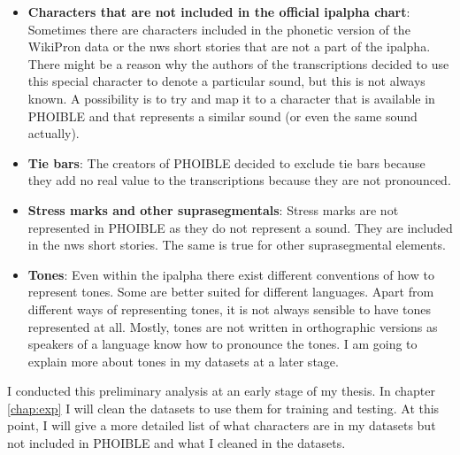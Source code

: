 \begin{itemize}
\item \textbf{Characters that are not included in the official \ac{ipalpha} chart}: Sometimes there are characters included in the phonetic version of the WikiPron data or the \ac{nws} short stories that are not a part of the \ac{ipalpha}. There might be a reason why the authors of the transcriptions decided to use this special character to denote a particular sound, but this is not always known. A possibility is to try and map it to a character that is available in PHOIBLE and that represents a similar sound (or even the same sound actually). 
\item \textbf{Tie bars}: The creators of PHOIBLE decided to exclude tie bars because they add no real value to the transcriptions because they are not pronounced.
\item \textbf{Stress marks and other suprasegmentals}: Stress marks are not represented in PHOIBLE as they do not represent a sound. They are included in the \ac{nws} short stories. The same is true for other suprasegmental elements.
\item \textbf{Tones}: Even within the \ac{ipalpha} there exist different conventions of how to represent tones. Some are better suited for different languages. Apart from different ways of representing tones, it is not always sensible to have tones represented at all. Mostly, tones are not written in orthographic versions as speakers of a language know how to pronounce the tones. I am going to explain more about tones in my datasets at a later stage.
\end{itemize}

I conducted this preliminary analysis at an early stage of my thesis. In chapter \ref{chap:exp} I will clean the datasets to use them for training and testing. At this point, I will give a more detailed list of what characters are in my datasets but not included in PHOIBLE and what I cleaned in the datasets.







